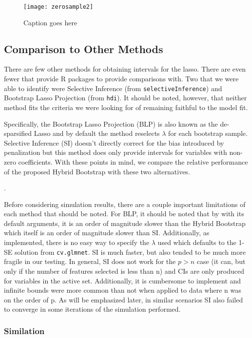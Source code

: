 \begin{figure}
  \texttt{[image: zerosample2]}
  \caption{\label{Fig:zerosample2} Caption goes here}
\end{figure}

\subsection{Comparison to Other Methods}

There are few other methods for obtaining intervals for the lasso. There are even fewer that provide R packages to provide comparisons with. Two that we were able to identify were Selective Inference (from \texttt{selectiveInference}) and Bootstrap Lasso Projection (from \texttt{hdi}). It should be noted, however, that neither method fits the criteria we were looking for of remaining faithful to the model fit.

Specifically, the Bootstrap Lasso Projection (BLP) is also known as the de-sparsified Lasso and by default the method reselects $\lambda$ for each bootstrap sample. Selective Inference (SI) doesn't directly correct for the bias introduced by penalization but this method does only provide intervals for variables with non-zero coefficients. With these points in mind, we compare the relative performance of the proposed Hybrid Bootstrap with these two alternatives.

.

Before considering simulation results, there are a couple important limitations of each method that should be noted. For BLP, it should be noted that by with its default arguments, it is an order of magnitude slower than the Hybrid Bootstrap which itself is an order of magnitude slower than SI. Additionally, as implemented, there is no easy way to specify the $\lambda$ used which defaults to the 1-SE solution from \texttt{cv.glmnet}. SI is much faster, but also tended to be much more fragile in our testing. In general, SI does not work for the $p > n$ case (it can, but only if the number of features selected is less than n) and CIs are only produced for variables in the active set. Additionally, it is cumbersome to implement and infinite bounds were more common than not when applied to data where n was on the order of p. As will be emphasized later, in similar scenarios SI also failed to converge in some iterations of the simulation performed. 

\subsubsection{Similation}

